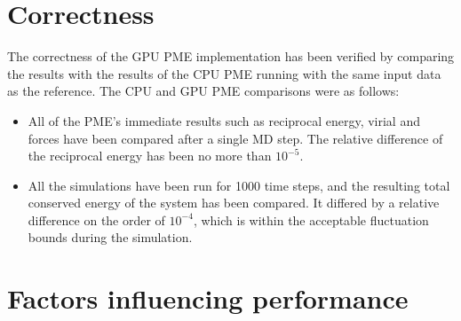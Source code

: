 \documentclass[12pt,a4paper]{report}
\newcommand{\draft}[1]{#1}
\begin{document}
\section{Correctness}
The correctness of the GPU PME implementation has been verified by comparing the results with the results of the CPU PME running with the same input data as the reference.
The CPU and GPU PME comparisons were as follows:
\begin{itemize}
\item All of the PME's immediate results such as reciprocal energy, virial and forces have been compared after a single MD step. The relative difference of the reciprocal energy has been no more than $10^{-5}$. 


\item All the simulations have been run for 1000 time steps, and the resulting total conserved energy of the system has been compared. It differed by a relative difference on the order of $10^{-4}$, which is within the acceptable fluctuation bounds during the simulation.
\end{itemize} 

\section{Factors influencing performance}
\end{document}
